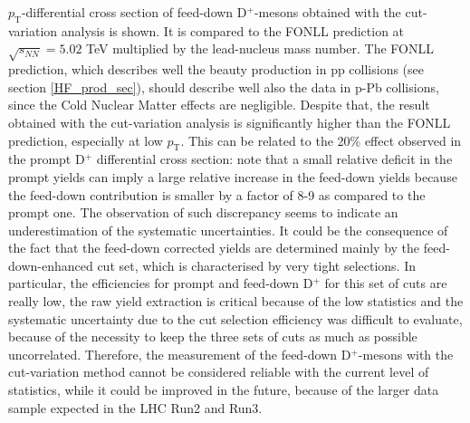 \documentclass[b5paper,10pt,twoside,oldstyle,classica]{toptesi}
\newcommand{\pt}{p_\text{T}}
\begin{document}
\begin{figure}[tb]
\end{figure} $\pt$-differential cross section of feed-down D$^+$-mesons obtained with the cut-variation analysis is shown. It is compared to the FONLL prediction at $\sqrt{s_{NN}} = 5.02$ TeV multiplied by the lead-nucleus mass number. The FONLL prediction, which describes well the beauty production in pp collisions (see section \ref{HF_prod_sec}), should describe well also the data in p-Pb collisions, since the Cold Nuclear Matter effects are negligible. Despite that, the result obtained with the cut-variation analysis is significantly higher than the FONLL prediction, especially at low $\pt$. This can be related to the 20\% effect observed in the prompt D$^+$ differential cross section: note that a small relative deficit in the prompt yields can imply a large relative increase in the feed-down yields because the feed-down contribution is smaller by a factor of 8-9 as compared to the prompt one. The observation of such discrepancy seems to indicate an underestimation of the systematic uncertainties. It could be the consequence of the fact that the feed-down corrected yields are determined mainly by the feed-down-enhanced cut set, which is characterised by very tight selections. In particular, the efficiencies for prompt and feed-down D$^+$ for this set of cuts are really low, the raw yield extraction is critical because of the low statistics and the systematic uncertainty due to the cut selection efficiency was difficult to evaluate, because of the necessity to keep the three sets of cuts as much as possible uncorrelated. Therefore, the measurement of the feed-down D$^+$-mesons with the cut-variation method cannot be considered reliable with the current level of statistics, while it could be improved in the future, because of the larger data sample expected in the LHC Run2 and  Run3.    
\end{document}
